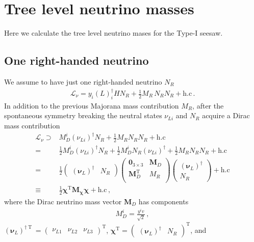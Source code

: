 \chapter{Tree level neutrino masses}
Here we calculate the tree level neutrino mases for the Type-I seesaw.

\section{One right-handed neutrino}
We assume to have just one right-handed neutrino $N_R$ 
\begin{align}
  \mathcal{L}_{\nu}=y_{i} \left( L \right)^{\dagger}_i H  N_R 
  +\tfrac{1}{2} M_R\, N_R  N_R + \text{h.c}\,.
\end{align}
In addition to the previous Majorana mass contribution $M_R$, after the spontaneous symmetry breaking the neutral states $\nu_{Li}$ and $N_R$  acquire a Dirac mass contribution
\begin{align}
  \mathcal{L}_{\nu}\supset & M_D^{i} \left( \nu_{Li} \right)^{\dagger} N_R +\frac{1}{2} M_R N_R N_R +\text{h.c} \nonumber\\
  =&  \frac{1}{2}M_D^{i} \left( \nu_{Li} \right)^{\dagger} N_R
     +\frac{1}{2}M_D^{i} N_R\left( \nu_{Li} \right)^{\dagger} +\frac{1}{2} M_R N_R N_R +\text{h.c} \nonumber\\
  =&\frac{1}{2}\begin{pmatrix} \left( \boldsymbol{\nu}_{L} \right)^{\dagger}  & N_R  \end{pmatrix}
 \begin{pmatrix}
   \mathbf{0}_{3 \times 3} &            \boldsymbol{M}_D \\
   \boldsymbol{M}_D^{\operatorname{T}} & M_R \\
 \end{pmatrix}
\begin{pmatrix} \left( \boldsymbol{\nu}_{L} \right)^{\dagger}  \\
    N_R  \end{pmatrix}+\text{h.c} \nonumber\\
  \equiv&\frac{1}{2} \boldsymbol{\chi}^{\operatorname{T}} \boldsymbol{M_{\chi}} \boldsymbol{\chi}+\text{h.c}\,,
\end{align}
where the Dirac neutrino mass vector $\boldsymbol{M}_D$ has components
\begin{align}
  M_D^i=\frac{y^i v}{\sqrt{2}}\,,
\end{align}
$\left( \boldsymbol{\nu}_{L} \right)^{\dagger\operatorname{T}}=
\begin{pmatrix}\nu_{L1} & \nu_{L2} & \nu_{L3} \end{pmatrix}^{\operatorname{T}}$, $\boldsymbol{\chi}^{\operatorname{T}}=\begin{pmatrix} \left( \boldsymbol{\nu}_L \right)^{\dagger}  & N_R  \end{pmatrix}^{\operatorname{T}}$, and
